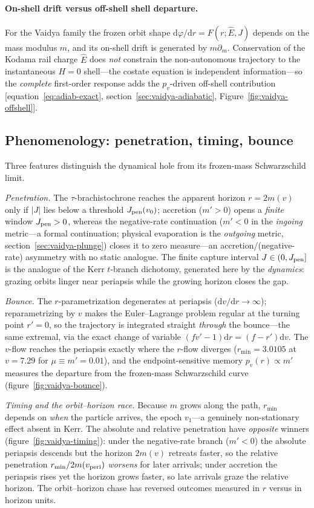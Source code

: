 \documentclass[12pt]{iopart}
\newcommand{\Ehat}{\hat E}
\newcommand{\Jpen}{J_{\rm pen}}
\newcommand{\dd}{\mathrm{d}}
\theoremstyle{plain}
\theoremstyle{definition}
\theoremstyle{plain}
\theoremstyle{remark}
\begin{document}
\paragraph{On-shell drift versus off-shell shell departure.} For the Vaidya family the frozen orbit shape
$\mathrm{d}\varphi/\mathrm{d}r=F(r;\Ehat,J)$ depends on the mass modulus $m$, and its
on-shell drift is generated by $m\partial_m$. Conservation of the Kodama rail charge
$\Ehat$ does \emph{not} constrain the non-autonomous trajectory to the instantaneous
$H=0$ shell---the costate equation is independent information---so the \emph{complete}
first-order response adds the $p_v$-driven off-shell contribution
[equation~\eqref{eq:adiab-exact}, section~\ref{sec:vaidya-adiabatic},
Figure~\ref{fig:vaidya-offshell}].


\subsection{Phenomenology: penetration, timing, bounce}
\label{sec:vaidya-pheno}
Three features distinguish the dynamical hole from its frozen-mass
Schwarzschild limit.

\emph{Penetration.} The $\tau$-brachistochrone reaches the apparent horizon
$r=2m(v)$ only if $|J|$ lies below a threshold $\Jpen(v_0)$; accretion ($m'>0$)
opens a \emph{finite} window $\Jpen>0$, whereas the negative-rate continuation
($m'<0$ in the \emph{ingoing} metric---a formal continuation; physical evaporation is
the \emph{outgoing} metric, section~\ref{sec:vaidya-plunge}) closes it to zero
measure---an accretion/(negative-rate) asymmetry with no static analogue. The
finite capture interval $J\in(0,\Jpen]$ is the analogue of the Kerr $t$-branch
dichotomy, generated here by the \emph{dynamics}: grazing orbits linger near
periapsis while the growing horizon closes the gap.

\emph{Bounce.} The $r$-parametrization degenerates at periapsis
($\dd v/\dd r\to\infty$); reparametrizing by $v$ makes the Euler--Lagrange
problem regular at the turning point $r'=0$, so the trajectory is integrated
straight \emph{through} the bounce---the same extremal, via the exact change of
variable $(f v'-1)\dd r=(f-r')\dd v$. The $v$-flow reaches the periapsis exactly
where the $r$-flow diverges ($r_{\min}=3.0105$ at $v=7.29$ for $\mu\equiv m'=0.01$),
and the endpoint-sensitive memory $p_v(r)\propto m'$ measures the departure from the
frozen-mass Schwarzschild curve (figure~\ref{fig:vaidya-bounce}).

\emph{Timing and the orbit--horizon race.} Because $m$ grows along the path,
$r_{\min}$ depends on \emph{when} the particle arrives, the epoch $v_1$---a
genuinely non-stationary effect absent in Kerr. The absolute and
relative penetration have \emph{opposite} winners
(figure~\ref{fig:vaidya-timing}): under the negative-rate branch ($m'<0$) the absolute
periapsis descends but the horizon $2m(v)$ retreats faster, so the relative penetration
$r_{\min}/2m(v_{\rm peri})$ \emph{worsens} for later arrivals; under accretion the
periapsis rises yet the horizon grows faster, so late arrivals graze the relative
horizon. The orbit--horizon chase has reversed outcomes measured in $r$ versus in
horizon units.
\end{document}

